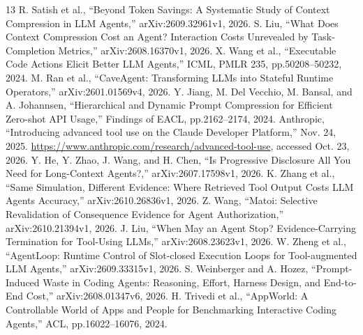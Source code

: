 \documentclass[uplatex,a4paper,twocolumn,10pt]{jsarticle}
\begin{document}
\begin{thebibliography}{13}\small
{} R. Satish et al., ``Beyond Token Savings: A Systematic Study of Context Compression in LLM Agents,'' arXiv:2609.32961v1, 2026.
 S. Liu, ``What Does Context Compression Cost an Agent? Interaction Costs Unrevealed by Task-Completion Metrics,'' arXiv:2608.16370v1, 2026.
 X. Wang et al., ``Executable Code Actions Elicit Better LLM Agents,'' ICML, PMLR 235, pp.50208--50232, 2024.
 M. Ran et al., ``CaveAgent: Transforming LLMs into Stateful Runtime Operators,'' arXiv:2601.01569v4, 2026.
 Y. Jiang, M. Del Vecchio, M. Bansal, and A. Johannsen, ``Hierarchical and Dynamic Prompt Compression for Efficient Zero-shot API Usage,'' Findings of EACL, pp.2162--2174, 2024.
 Anthropic, ``Introducing advanced tool use on the Claude Developer Platform,'' Nov. 24, 2025. \url{https://www.anthropic.com/research/advanced-tool-use}, accessed Oct. 23, 2026.
 Y. He, Y. Zhao, J. Wang, and H. Chen, ``Is Progressive Disclosure All You Need for Long-Context Agents?,'' arXiv:2607.17598v1, 2026.
 K. Zhang et al., ``Same Simulation, Different Evidence: Where Retrieved Tool Output Costs LLM Agents Accuracy,'' arXiv:2610.26836v1, 2026.
 Z. Wang, ``Matoi: Selective Revalidation of Consequence Evidence for Agent Authorization,'' arXiv:2610.21394v1, 2026.
 J. Liu, ``When May an Agent Stop? Evidence-Carrying Termination for Tool-Using LLMs,'' arXiv:2608.23623v1, 2026.
 W. Zheng et al., ``AgentLoop: Runtime Control of Slot-closed Execution Loops for Tool-augmented LLM Agents,'' arXiv:2609.33315v1, 2026.
 S. Weinberger and A. Hozez, ``Prompt-Induced Waste in Coding Agents: Reasoning, Effort, Harness Design, and End-to-End Cost,'' arXiv:2608.01347v6, 2026.
 H. Trivedi et al., ``AppWorld: A Controllable World of Apps and People for Benchmarking Interactive Coding Agents,'' ACL, pp.16022--16076, 2024.
\end{thebibliography}
\end{document}
